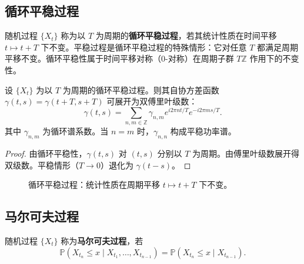 \subsection{循环平稳过程}

\begin{definition}[循环平稳过程]\label{ch14_cyclostationary}
随机过程 $\{X_t\}$ 称为以 $T$ 为周期的\textbf{循环平稳过程}，若其统计性质在时间平移 $t \mapsto t + T$ 下不变。平稳过程是循环平稳过程的特殊情形：它对任意 $T$ 都满足周期平移不变。循环平稳性属于时间平移对称（$0$-对称）在周期子群 $T\mathbb{Z}$ 作用下的不变性。
\end{definition}

\begin{proposition}[循环平稳过程的傅里叶分解]\label{prop:cyclostationary_fourier}
设 $\{X_t\}$ 为以 $T$ 为周期的循环平稳过程。则其自协方差函数 $\gamma(t, s) = \gamma(t+T, s+T)$ 可展开为双傅里叶级数：
\[
\gamma(t, s) = \sum_{n, m \in \mathbb{Z}} \gamma_{n,m} e^{i 2\pi n t/T} e^{-i 2\pi m s/T}.
\]
其中 $\gamma_{n,m}$ 为循环谱系数。当 $n = m$ 时，$\gamma_{n,n}$ 构成平稳功率谱。
\end{proposition}

\begin{proof}
由循环平稳性，$\gamma(t, s)$ 对 $(t, s)$ 分别以 $T$ 为周期。由傅里叶级数展开得双级数。平稳情形（$T \to 0$）退化为 $\gamma(t-s)$。
\end{proof}

\begin{figure}[htbp]
\centering
{}
\caption{循环平稳过程：统计性质在周期平移 $t\mapsto t+T$ 下不变。}
\label{fig:cyclostationary}
\end{figure}

\subsection{马尔可夫过程}

\begin{definition}[马尔可夫过程]\label{def:markov_process}
随机过程 $\{X_t\}$ 称为\textbf{马尔可夫过程}，若
\[
\mathbb{P}(X_{t_n} \le x \mid X_{t_1}, \dots, X_{t_{n-1}}) = \mathbb{P}(X_{t_n} \le x \mid X_{t_{n-1}}).
\]
\end{definition}

